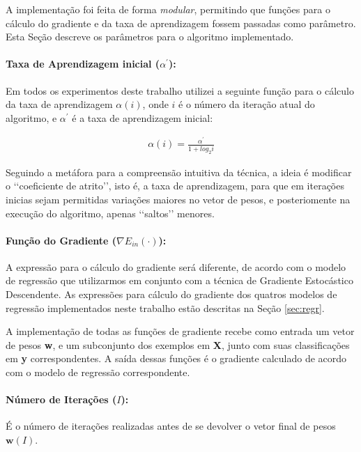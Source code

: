 \documentclass[a4paper, 12pt]{article}
\begin{document}
A implementação foi feita de forma \textit{modular}, permitindo que funções
para o cálculo do gradiente e da taxa de aprendizagem fossem passadas como
parâmetro. Esta Seção descreve os parâmetros para o algoritmo implementado.

\paragraph{Taxa de Aprendizagem inicial ($\alpha^{\prime}$):}

Em todos os experimentos deste trabalho utilizei a seguinte função
para o cálculo da taxa de aprendizagem $\alpha(i)$, onde $i$ é o número da
iteração atual do algoritmo, e $\alpha^{\prime}$ é a taxa de aprendizagem
inicial:

\begin{align*}
    \alpha(i) = \frac{\alpha^{\prime}}{1 + log_{2}i}
\end{align*}

Seguindo a metáfora para a compreensão intuitiva da técnica, a ideia é
modificar o \lq\lq{}coeficiente de atrito\rq\rq{}, isto é, a taxa de
aprendizagem, para que em iterações inicias sejam permitidas variações maiores
no vetor de pesos, e posteriomente na execução do algoritmo, apenas
\lq\lq{}saltos\rq\rq{} menores.

\paragraph{Função do Gradiente ($\nabla{}E_{in}(\cdot)$):}

A expressão para o cálculo do gradiente será diferente, de acordo com o modelo
de regressão que utilizarmos em conjunto com a técnica de Gradiente Estocástico
Descendente. As expressões para cálculo do gradiente dos quatros modelos de
regressão implementados neste trabalho estão descritas na Seção \ref{sec:regr}.

A implementação de todas as funções de gradiente recebe como entrada um vetor
de pesos \textbf{w}, e um subconjunto dos exemplos em \textbf{X}, junto com
suas classificações em \textbf{y} correspondentes. A saída dessas funções é o
gradiente calculado de acordo com o modelo de regressão correspondente.

\paragraph{Número de Iterações ($I$):}

É o número de iterações realizadas antes de se devolver o vetor final de pesos
$\textbf{w}(I)$.
\end{document}
